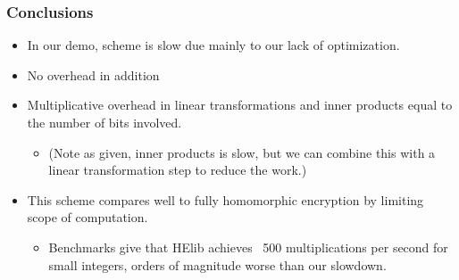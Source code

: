 \documentclass{beamer}
\newcommand{\itz}[1]{\begin{itemize}#1\end{itemize}} %
\begin{document}
\begin{frame}
\frametitle{Conclusions}
\itz{
\item{In our demo, scheme is slow due mainly to our lack of optimization.}
\vspace{.1in}
\item{No overhead in addition}
\item{Multiplicative overhead in linear transformations and inner products equal to the number of bits involved.
	\itz{
		\item{(Note as given, inner products is slow, but we can combine this with a linear transformation step to reduce the work.)}
	}
}
\vspace{.1in}
\item{This scheme compares well to fully homomorphic encryption by limiting scope of computation.
	\itz{
		\item{Benchmarks give that HElib achieves ~500 multiplications per second for small integers, orders of magnitude worse than our slowdown.}
	}
}
}
\end{frame}
\end{document}
